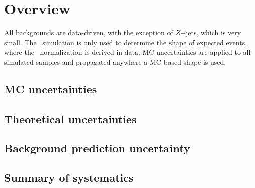 \section{Overview}
All backgrounds are data-driven, with the exception of $Z$+jets, which is very small. The \ttbar\ simulation is only used to determine the shape of expected events, where the \ttbar\ normalization is derived in data. MC uncertainties are applied to all simulated samples and propagated anywhere a MC based shape is used.

\subsection{MC uncertainties}
\label{sec:boosted-systematics-mc}


\subsection{Theoretical uncertainties}
\label{sec:boosted-systematics-theory}


\subsection{Background prediction uncertainty}
\label{sec:boosted-systematics-bkg}


\subsection{Summary of systematics}
\label{sec:boosted-systematics-numbers}

